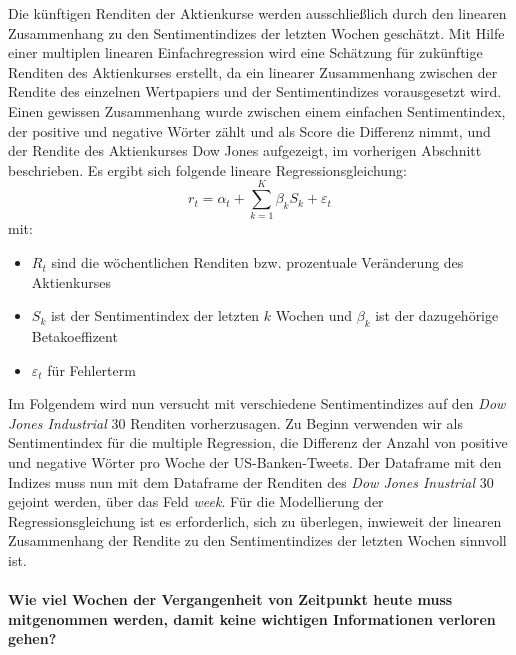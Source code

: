 Die künftigen Renditen der Aktienkurse werden ausschließlich
durch den linearen Zusammenhang zu den Sentimentindizes der letzten Wochen geschätzt. Mit Hilfe einer multiplen linearen Einfachregression wird eine Schätzung für zukünftige Renditen des Aktienkurses erstellt, da ein linearer Zusammenhang zwischen der Rendite des einzelnen Wertpapiers und der Sentimentindizes vorausgesetzt wird. Einen gewissen Zusammenhang wurde zwischen einem einfachen Sentimentindex, der positive und negative Wörter zählt und als Score die Differenz nimmt, und der Rendite des Aktienkurses  Dow Jones aufgezeigt, im  vorherigen Abschnitt beschrieben. Es ergibt sich folgende lineare Regressionsgleichung:
\begin{equation}
r_{t}=\alpha_{t}+ \sum_{k=1}^{K} \beta_{k} S_{k}+\varepsilon_{t}
\end{equation}
mit:
\begin{itemize}
	\item  $R_{t}$ sind die wöchentlichen Renditen bzw. prozentuale Veränderung des Aktienkurses
	\item $S_{k}$ ist der Sentimentindex der letzten $k$ Wochen und $\beta_{k}$ ist der dazugehörige Betakoeffizent
	\item $\varepsilon_{t}$ für  Fehlerterm 
\end{itemize}
Im Folgendem wird nun versucht mit verschiedene Sentimentindizes auf den \textit{Dow Jones Industrial} $30$ Renditen vorherzusagen. Zu Beginn verwenden wir als Sentimentindex für die multiple Regression, die Differenz der Anzahl von positive und negative Wörter pro Woche der US-Banken-Tweets. Der Dataframe mit den Indizes muss nun mit dem Dataframe der Renditen  des \textit{Dow Jones Inustrial} $30$ gejoint werden, über das Feld \textit{week}. Für die Modellierung der Regressionsgleichung ist es erforderlich, sich zu überlegen, inwieweit der linearen Zusammenhang der Rendite zu den Sentimentindizes der letzten Wochen sinnvoll ist. \\
\\
\textbf{Wie viel Wochen der Vergangenheit von Zeitpunkt heute muss mitgenommen werden, damit keine wichtigen Informationen verloren gehen?} 
\\
\\
